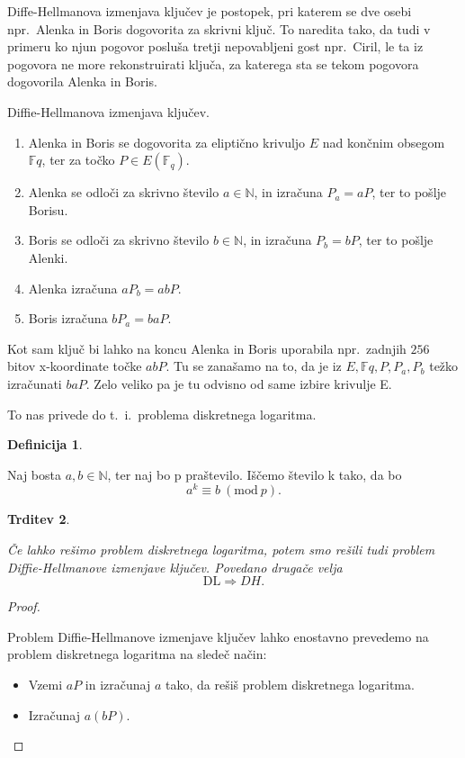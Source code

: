 \documentclass[12pt,a4paper,twoside]{article}
\theoremstyle{definition} %
\newtheorem{definicija}{Definicija}[section]
\theoremstyle{plain} %
\newtheorem{trditev}[definicija]{Trditev}
\numberwithin{equation}{section}  %
\newcommand{\N}{\mathbb N}
\newcommand{\F}{\mathbb F}
\newcommand{\Fq}[1]{{\mathbb{F}_{#1}}}
\newcommand{\E}[1]{E({#1})}
\begin{document}
Diffe-Hellmanova izmenjava ključev je postopek, pri katerem se dve osebi npr.\  Alenka in Boris dogovorita za skrivni ključ. To naredita tako, da tudi v primeru ko njun pogovor posluša tretji nepovabljeni gost npr.\  Ciril, le ta iz pogovora ne more rekonstruirati ključa, za katerega sta se tekom pogovora dogovorila Alenka in Boris. 
\begin{algorithm}[H]
\caption[Diffe-Hellman]{Diffie-Hellmanova izmenjava ključev.}
\label{alg:diffie-hellman}

\begin{enumerate}

\item Alenka in Boris se dogovorita za eliptično krivuljo $E$ nad končnim obsegom $\F{q}$, ter za točko $P \in \E{\Fq{q}}$.
\item Alenka se odloči za skrivno število $a \in \N$, in izračuna $P_a = aP$, ter to pošlje Borisu.
\item Boris se odloči za skrivno število $b \in \N$, in izračuna $P_b = bP$, ter to pošlje Alenki.
\item Alenka izračuna $aP_b=abP$.
\item Boris izračuna $bP_a=baP$.

\end{enumerate}
\end{algorithm}

Kot sam ključ bi lahko na koncu Alenka in Boris uporabila npr.\  zadnjih $256$ bitov x-koordinate točke $abP$. Tu se zanašamo na to, da je iz $E, \F{q},P, P_a, P_b$ težko izračunati $baP$. Zelo veliko pa je tu odvisno od same izbire krivulje E.

To nas privede do t.\ i.\ problema diskretnega logaritma.


\begin{definicija}~

Naj bosta $a, b \in \N$, ter naj bo p praštevilo. Iščemo število k tako, da bo
$$a^k \equiv b\ (\text{mod} \ p).$$
\end{definicija}

\begin{trditev}~

Če lahko rešimo problem diskretnega logaritma, potem smo rešili tudi problem Diffie-Hellmanove izmenjave ključev. Povedano drugače velja
$$\text{DL} \Rightarrow DH.$$
\end{trditev}

\begin{proof}~

Problem Diffie-Hellmanove izmenjave ključev lahko enostavno prevedemo na problem diskretnega logaritma na sledeč način:

\begin{itemize}
\item Vzemi $aP$ in izračunaj $a$ tako, da rešiš problem diskretnega logaritma.
\item Izračunaj $a(bP)$.
\end{itemize}

\end{proof}
\end{document}
